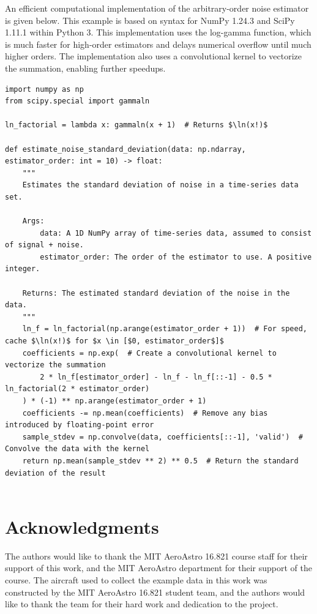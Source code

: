 \documentclass[conf]{new-aiaa}
\begin{document}
    An efficient computational implementation of the arbitrary-order noise estimator is given below. This example is based on syntax for NumPy 1.24.3 and SciPy 1.11.1 within Python 3. This implementation uses the log-gamma function, which is much faster for high-order estimators and delays numerical overflow until much higher orders. The implementation also uses a convolutional kernel to vectorize the summation, enabling further speedups.

    \begin{listing}[H]
        \begin{verbatim}
import numpy as np
from scipy.special import gammaln

ln_factorial = lambda x: gammaln(x + 1)  # Returns $\ln(x!)$

def estimate_noise_standard_deviation(data: np.ndarray, estimator_order: int = 10) -> float:
    """
    Estimates the standard deviation of noise in a time-series data set.

    Args:
        data: A 1D NumPy array of time-series data, assumed to consist of signal + noise.
        estimator_order: The order of the estimator to use. A positive integer.

    Returns: The estimated standard deviation of the noise in the data.
    """
    ln_f = ln_factorial(np.arange(estimator_order + 1))  # For speed, cache $\ln(x!)$ for $x \in [$0, estimator_order$]$
    coefficients = np.exp(  # Create a convolutional kernel to vectorize the summation
        2 * ln_f[estimator_order] - ln_f - ln_f[::-1] - 0.5 * ln_factorial(2 * estimator_order)
    ) * (-1) ** np.arange(estimator_order + 1)
    coefficients -= np.mean(coefficients)  # Remove any bias introduced by floating-point error
    sample_stdev = np.convolve(data, coefficients[::-1], 'valid')  # Convolve the data with the kernel
    return np.mean(sample_stdev ** 2) ** 0.5  # Return the standard deviation of the result


        \end{verbatim}
        \caption{Example efficient implementation of the arbitrary-order noise estimator using NumPy/SciPy in Python 3.}
        \label{listing:efficient_arbitrary_order_noise_estimator}
    \end{listing}

    \section*{Acknowledgments}
    The authors would like to thank the MIT AeroAstro 16.821 course staff for their support of this work, and the MIT AeroAstro department for their support of the course. The aircraft used to collect the example data in this work was constructed by the MIT AeroAstro 16.821 student team, and the authors would like to thank the team for their hard work and dedication to the project.

    
\end{document}

